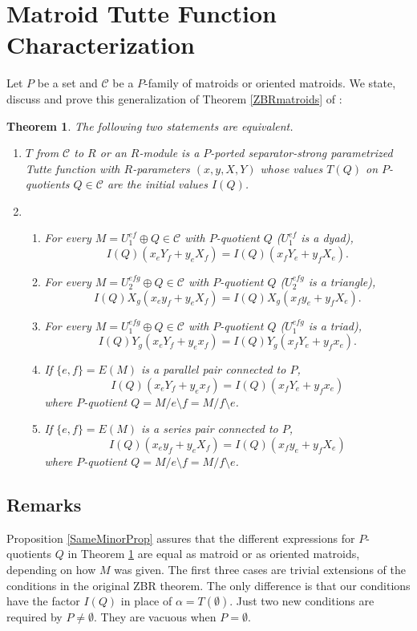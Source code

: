 \documentclass[12pt,leqno]{amsart}
\newtheorem{thm}[lem]{Theorem}
\theoremstyle{remark}
\begin{document}
\section{Matroid Tutte Function Characterization}
\label{ParamTutteSec}
Let $P$ be a set and $\mathcal{C}$ be a $P$-family of matroids or oriented
matroids.  We state, discuss and prove this
generalization of Theorem \ref{ZBRmatroids} of \cite{Ellis-Monaghan-Traldi}:

\begin{thm}
\label{BigTheorem}
The following two statements are equivalent.
\begin{enumerate}
\item $T$ from $\mathcal{C}$ to $R$ or an $R$-module is a $P$-ported 
separator-strong parametrized
Tutte function with $R$-parameters $(x, y, X, Y)$ whose values 
$T(Q)$ on $P$-quotients $Q\in\mathcal{C}$ are the initial
values $I(Q)$.
\item
\begin{enumerate}
\item For every $M=U^{ef}_1\oplus Q\in\mathcal{C}$ with 
$P$-quotient $Q$ ($U^{ef}_1$ is a dyad), 
\[
I(Q)(x_e Y_f + y_e X_f) = 
I(Q)(x_f Y_e + y_f X_e).
\]
\item
For every $M=U^{efg}_2\oplus Q\in\mathcal{C}$ with 
$P$-quotient $Q$ ($U^{efg}_2$ is a triangle), 
\[
I(Q)X_g(x_e y_f + y_e X_f) = 
I(Q)X_g(x_f y_e + y_f X_e).
\]
\item
For every $M=U^{efg}_1\oplus Q\in\mathcal{C}$ with 
$P$-quotient $Q$  ($U^{efg}_1$ is a triad), 
\[
I(Q)Y_g(x_e Y_f + y_e x_f) = 
I(Q)Y_g(x_f Y_e + y_f x_e).
\]
\item
If $\{e,f\}=E(M)$ is a parallel pair connected to $P$, 
\[
I(Q)(x_e Y_f + y_e x_f) = 
I(Q)(x_f Y_e + y_f x_e)
\]
where $P$-quotient $Q=M/e\setminus f=M/f\setminus e$.
\item
If $\{e,f\}=E(M)$ is a series pair connected to $P$, 
\[
I(Q)(x_e y_f + y_e X_f) = 
I(Q)(x_f y_e + y_f X_e)
\]
where $P$-quotient $Q=M/e\setminus f=M/f\setminus e$.
\end{enumerate}
\end{enumerate}
\end{thm}

\subsection{Remarks}
Proposition \ref{SameMinorProp} assures that the different 
expressions for $P$-quotients $Q$ in Theorem \ref{BigTheorem} 
are equal as matroid or as oriented matroids, depending
on how $M$ was given.  
The first three cases are trivial extensions of 
the conditions in the original ZBR theorem.
The only difference
is that our conditions have the factor $I(Q)$ 
in place of $\alpha=T(\emptyset)$.
Just two new conditions are required by $P\neq\emptyset$.  They
are vacuous when $P=\emptyset$.  
\end{document}
